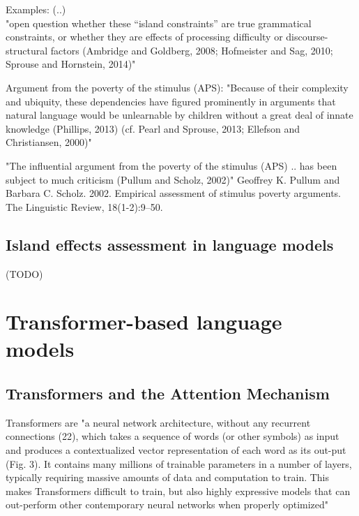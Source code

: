 Examples: (..) \\

"open question whether these “island constraints” are true grammatical constraints, or whether they are effects of processing difficulty or discourse-structural factors (Ambridge and Goldberg, 2008; Hofmeister and Sag, 2010; Sprouse and Hornstein, 2014)" \citep{wilcox2018rnn} 

Argument from the poverty of the stimulus (APS):
"Because of their complexity and ubiquity, these dependencies have figured prominently in arguments that natural language would be unlearnable by children without a great deal of innate knowledge (Phillips, 2013) (cf. Pearl and Sprouse, 2013; Ellefson and Christiansen, 2000)" \citep{wilcox2018rnn} 

"The influential argument from the poverty of the stimulus (APS) ..  has been subject to much criticism (Pullum and Scholz, 2002)"  Geoffrey K. Pullum and Barbara C. Scholz. 2002. Empirical assessment of stimulus poverty arguments. The Linguistic Review, 18(1-2):9–50.



\subsection{Island effects assessment in language models}

(TODO)


\pagebreak

\section{Transformer-based language models}


\subsection{Transformers and the Attention Mechanism}

Transformers  are "a neural network architecture,  without  any  recurrent  connections  (22),  which  takes  a sequence  of  words  (or  other  symbols)  as  input  and  produces a contextualized vector representation of each word as its out-put (Fig. 3). It contains many millions of trainable parameters in  a  number  of  layers,  typically  requiring  massive  amounts  of data  and  computation  to  train.  This  makes  Transformers  difficult  to  train,  but  also  highly  expressive  models  that  can  out-perform  other  contemporary  neural  networks  when  properly optimized" \citep{manning2020emergent}

